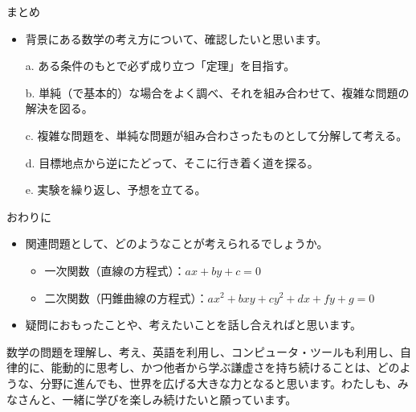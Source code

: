 \documentclass[10pt, dvipdfmx]{beamer}
\begin{document}
\begin{frame}{まとめ}
\begin{itemize}
\item 背景にある数学の考え方について、確認したいと思います。
\end{itemize}

\bigskip
\begin{itemize}
\item[a.] ある条件のもとで必ず成り立つ「定理」を目指す。

\medskip
\item[b.] 単純（で基本的）な場合をよく調べ、それを組み合わせて、複雑な問題の解決を図る。

\medskip
\item[c.] 複雑な問題を、単純な問題が組み合わさったものとして分解して考える。

\medskip
\item[d.] 目標地点から逆にたどって、そこに行き着く道を探る。

\medskip
\item[e.] 実験を繰り返し、予想を立てる。
\end{itemize}
\end{frame}
\begin{frame}{おわりに}
\begin{itemize}
\item 関連問題として、どのようなことが考えられるでしょうか。
\begin{itemize}
\item 一次関数（直線の方程式）：$ax+by+c = 0$
\item 二次関数（円錐曲線の方程式）：$ax^2 + bxy + cy^2 + dx + fy + g = 0$
\end{itemize}
\item 疑問におもったことや、考えたいことを話し合えればと思います。
\end{itemize}

\bigskip
数学の問題を理解し、考え、英語を利用し、コンピュータ・ツールも利用し、自律的に、能動的に思考し、かつ他者から学ぶ謙虚さを持ち続けることは、どのような、分野に進んでも、世界を広げる大きな力となると思います。わたしも、みなさんと、一緒に学びを楽しみ続けたいと願っています。
\end{frame}
\end{document}
